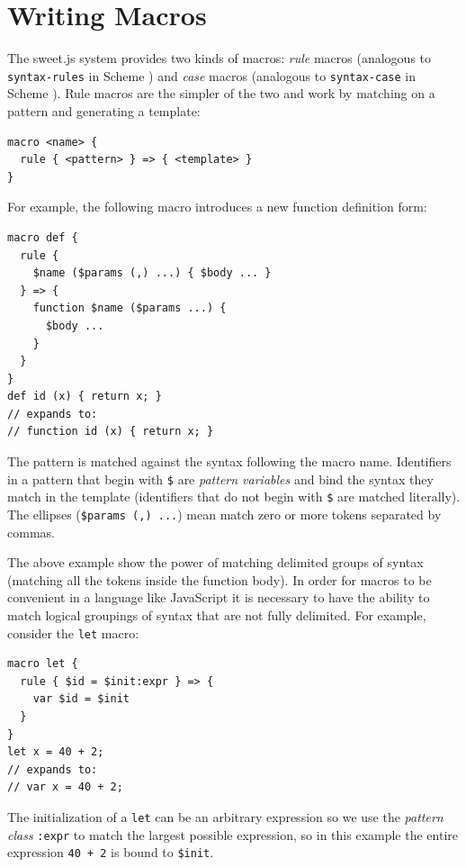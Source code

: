 \documentclass[preprint,10pt]{sigplanconf}
\begin{document}
\section{Writing Macros}
\label{sec:writingMacros}

The sweet.js system provides two kinds of macros: \emph{rule} macros
(analogous to \verb!syntax-rules! in Scheme \cite{Clinger1991})
and \emph{case} macros (analogous to \verb!syntax-case! in
Scheme \cite{Hieb1992}). Rule macros are the simpler of the two and work by matching
on a pattern and generating a template:

\begin{lstlisting}
macro <name> {
  rule { <pattern> } => { <template> }
}
\end{lstlisting}

For example, the following macro introduces a new function definition
form:

\begin{lstlisting}
macro def {
  rule { 
    $name ($params (,) ...) { $body ... } 
  } => {
    function $name ($params ...) {
      $body ...
    }
  }
}
def id (x) { return x; }
// expands to:
// function id (x) { return x; }
\end{lstlisting}

The pattern is matched against the syntax following the macro name.
Identifiers in a pattern that begin with \verb!$! are
\emph{pattern variables} and bind the syntax they match in the
template (identifiers that do not begin with \verb!$! are matched
literally). The ellipses (\verb!$params (,) ...!) mean match zero or more
tokens separated by commas.

The above example show the power of matching delimited groups of
syntax (\ie matching all the tokens inside the function body). In
order for macros to be convenient in a language like JavaScript it is
necessary to have the ability to match logical groupings of syntax
that are not fully delimited. For example, consider the
\verb!let! macro:

\begin{lstlisting}
macro let {
  rule { $id = $init:expr } => {
    var $id = $init
  }
}
let x = 40 + 2;
// expands to:
// var x = 40 + 2;
\end{lstlisting}

The initialization of a \verb!let! can be an arbitrary expression
so we use the \emph{pattern class} \verb!:expr! to match the
largest possible expression, so in this example the entire expression
\verb!40 + 2! is bound to \verb!$init!.
\end{document}
